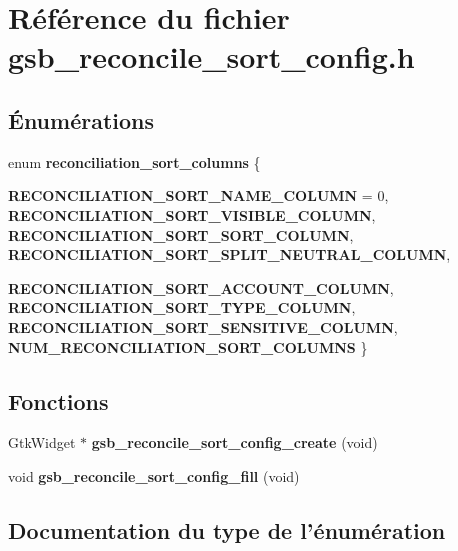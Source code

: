 \section{Référence du fichier gsb\_\-reconcile\_\-sort\_\-config.h}
\label{gsb__reconcile__sort__config_8h}
\subsection*{Énumérations}
\begin{DoxyCompactItemize}
\item 
enum {\bf reconciliation\_\-sort\_\-columns} \{ \par
{\bf RECONCILIATION\_\-SORT\_\-NAME\_\-COLUMN} =  0, 
{\bf RECONCILIATION\_\-SORT\_\-VISIBLE\_\-COLUMN}, 
{\bf RECONCILIATION\_\-SORT\_\-SORT\_\-COLUMN}, 
{\bf RECONCILIATION\_\-SORT\_\-SPLIT\_\-NEUTRAL\_\-COLUMN}, 
\par
{\bf RECONCILIATION\_\-SORT\_\-ACCOUNT\_\-COLUMN}, 
{\bf RECONCILIATION\_\-SORT\_\-TYPE\_\-COLUMN}, 
{\bf RECONCILIATION\_\-SORT\_\-SENSITIVE\_\-COLUMN}, 
{\bf NUM\_\-RECONCILIATION\_\-SORT\_\-COLUMNS}
 \}
\end{DoxyCompactItemize}
\subsection*{Fonctions}
\begin{DoxyCompactItemize}
\item 
GtkWidget $\ast$ {\bf gsb\_\-reconcile\_\-sort\_\-config\_\-create} (void)
\item 
void {\bf gsb\_\-reconcile\_\-sort\_\-config\_\-fill} (void)
\end{DoxyCompactItemize}


\subsection{Documentation du type de l'énumération}
